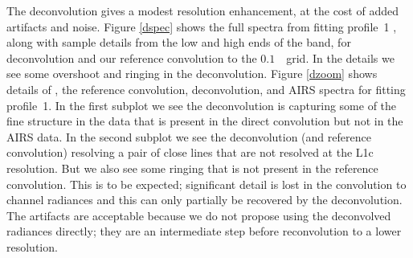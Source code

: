 \documentclass[journal]{IEEEtran}
\begin{document}
The {\airs} deconvolution gives a modest resolution enhancement, at
the cost of added artifacts and noise.  Figure \ref{dspec} shows the
full spectra from fitting profile~1 \cite{sarta1,sarta2}, along with
sample details from the low and high ends of the band, for {\airs}
deconvolution and our reference convolution to the $0.1$~\wn\ grid.
In the details we see some overshoot and ringing in the
deconvolution.  Figure \ref{dzoom} shows details of {\kcarta}, the
reference convolution, deconvolution, and AIRS spectra for fitting
profile~1.  In the first subplot we see the deconvolution is
capturing some of the fine structure in the {\kcarta} data that is
present in the direct convolution but not in the AIRS data.  In the
second subplot we see the deconvolution (and reference convolution)
resolving a pair of close lines that are not resolved at the {\airs}
L1c resolution.  But we also see some ringing that is not present in
the reference convolution.  This is to be expected; significant
detail is lost in the convolution to {\airs} channel radiances and
this can only partially be recovered by the deconvolution.  The
artifacts are acceptable because we do not propose using the
deconvolved radiances directly; they are an intermediate step before
reconvolution to a lower resolution.


\end{document}
